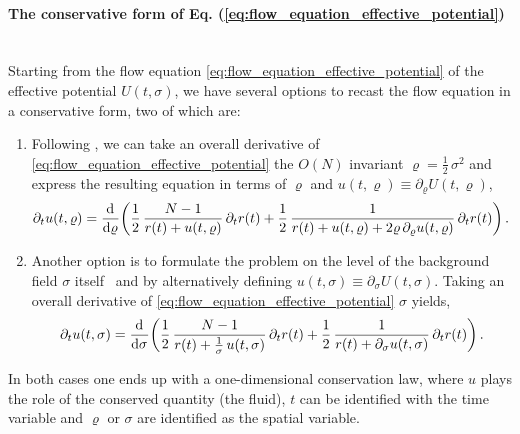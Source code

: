 {%
\hypersetup{linkcolor=black}%
\paragraph{The conservative form of Eq. \textbf{(\protect\ref{eq:flow_equation_effective_potential})}}\label{paragraph:conservative_form_equation}\mbox{}%
}\\
Starting from the \frg{} flow equation \eqref{eq:flow_equation_effective_potential} of the effective potential $U ( t, \sigma )$, we have several options to recast the flow equation in a conservative form, two of which are:
\begin{enumerate}
	\item	Following , we can take an overall derivative of \cref{eq:flow_equation_effective_potential} \wrt{} the $O(N)$ invariant $\varrho = \tfrac{1}{2}\,\sigma^2$ and express the resulting equation in terms of $\varrho$ and $u ( t, \varrho ) \equiv \partial_\varrho U ( t, \varrho )$,
		\begin{align}
			\partial_t u ( t, \varrho ) = \dod{}{\varrho}\! \bigg( \frac{1}{2} \, \frac{N - 1}{r ( t ) + u ( t, \varrho )}\,\partial_t r ( t )  + \frac{1}{2} \, \frac{1}{r ( t ) + u ( t, \varrho ) + 2 \varrho \, \partial_\varrho u ( t, \varrho )}\,\partial_t r ( t )  \bigg) \, .	\label{eq:conservation_law_u_rho}
		\end{align}

	\item	Another option is to formulate the problem on the level of the background field $\sigma$ itself~\cite{Koenigstein:2020Talk} and by alternatively defining $u ( t, \sigma ) \equiv \partial_\sigma U ( t, \sigma )$. 
	Taking an overall derivative of \cref{eq:flow_equation_effective_potential} \wrt{} $\sigma$ yields,
		\begin{align}
			\partial_t u ( t, \sigma ) = \dod{}{\sigma} \! \bigg( \frac{1}{2} \, \frac{N - 1}{r ( t ) + \frac{1}{\sigma} \, u ( t, \sigma )}\,\partial_t r ( t )  + \frac{1}{2} \, \frac{1}{r ( t ) + \partial_\sigma u ( t, \sigma )}\,\partial_t r ( t )  \bigg) \, .	\label{eq:conservation_law_u_phi}
		\end{align}
\end{enumerate}
In both cases one ends up with a one-dimensional conservation law, where $u$ plays the role of the conserved quantity (the fluid), $t$ can be identified with the time variable and $\varrho$ or $\sigma$ are identified as the spatial variable.


